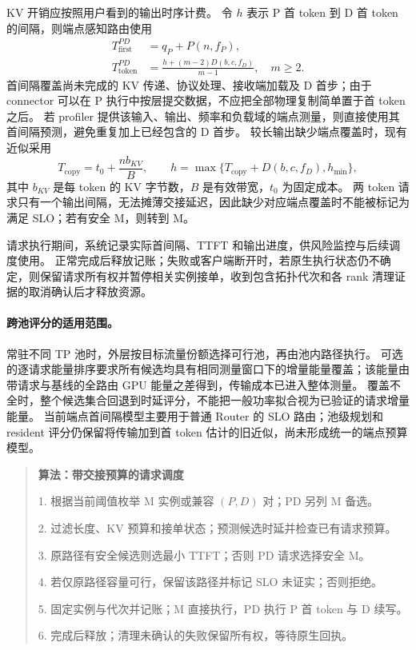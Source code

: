 KV 开销应按照用户看到的输出时序计费。
令 $h$ 表示 P 首 token 到 D 首 token 的间隔，则端点感知路由使用
\begin{align}
 T_{\mathrm{first}}^{PD}&=q_P+P(n,f_P),\\
 T_{\mathrm{token}}^{PD}&=\frac{h+(m-2)D(b,c,f_D)}{m-1},\quad m\ge2.
\end{align}
首间隔覆盖尚未完成的 KV 传递、协议处理、接收端加载及 D 首步；由于 connector 可以在 P 执行中按层提交数据，不应把全部物理复制简单置于首 token 之后。
若 profiler 提供该输入、输出、频率和负载域的端点测量，则直接使用其首间隔预测，避免重复加上已经包含的 D 首步。
较长输出缺少端点覆盖时，现有近似采用
\begin{equation}
 T_{\mathrm{copy}}=t_0+\frac{n b_{KV}}{B},\qquad
 h=\max\{T_{\mathrm{copy}}+D(b,c,f_D),h_{\min}\},
\end{equation}
其中 $b_{KV}$ 是每 token 的 KV 字节数，$B$ 是有效带宽，$t_0$ 为固定成本。
两 token 请求只有一个输出间隔，无法摊薄交接延迟，因此缺少对应端点覆盖时不能被标记为满足 SLO；若有安全 M，则转到 M。

请求执行期间，系统记录实际首间隔、TTFT 和输出进度，供风险监控与后续调度使用。
正常完成后释放记账；失败或客户端断开时，若原生执行状态仍不确定，则保留请求所有权并暂停相关实例接单，收到包含拓扑代次和各 rank 清理证据的取消确认后才释放资源。

\paragraph{跨池评分的适用范围。}
常驻不同 TP 池时，外层按目标流量份额选择可行池，再由池内路径执行。
可选的逐请求能量排序要求所有候选均具有相同测量窗口下的增量能量覆盖；该能量由带请求与基线的全路由 GPU 能量之差得到，传输成本已进入整体测量。
覆盖不全时，整个候选集合回退到时延评分，不能把一般功率拟合视为已验证的请求增量能量。
当前端点首间隔模型主要用于普通 Router 的 SLO 路由；池级规划和 resident 评分仍保留将传输加到首 token 估计的旧近似，尚未形成统一的端点预算模型。

\begin{quote}\small
\textbf{算法：带交接预算的请求调度}\par
1. 根据当前阈值枚举 M 实例或兼容 $(P,D)$ 对；PD 另列 M 备选。\par
2. 过滤长度、KV 预算和接单状态；预测候选时延并检查已有请求预算。\par
3. 原路径有安全候选则选最小 TTFT；否则 PD 请求选择安全 M。\par
4. 若仅原路径容量可行，保留该路径并标记 SLO 未证实；否则拒绝。\par
5. 固定实例与代次并记账；M 直接执行，PD 执行 P 首 token 与 D 续写。\par
6. 完成后释放；清理未确认的失败保留所有权，等待原生回执。
\end{quote}
